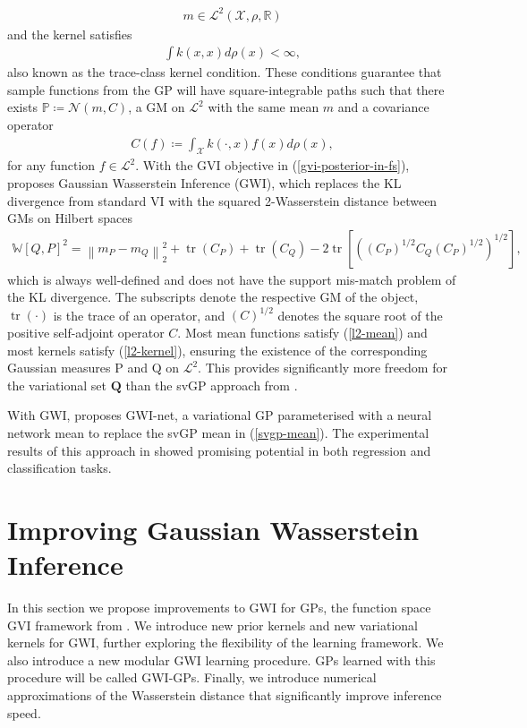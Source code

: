 \documentclass{article}
\newcommand{\tr}{\operatorname{tr}}
\numberwithin{equation}{section}
\begin{document}
\begin{align}
    m \in \mathcal{L}^2\left(\mathcal{X}, \rho, \mathbb{R}\right)
    \label{l2-mean}
\end{align}
and the kernel satisfies
\begin{align}
    \int k(x, x) d\rho(x) < \infty,
    \label{l2-kernel}
\end{align}
also known as the trace-class kernel condition.
These conditions guarantee that sample functions from the GP will have square-integrable paths such that there exists $\mathbb{P} \coloneqq \mathcal{N}(m, C)$, a GM on $\mathcal{L}^2$ with the same mean $m$ and a covariance operator
\begin{align}
    C(f) \coloneqq \int_{\mathcal{X}} k(\cdot, x) f(x) d\rho(x),
\end{align}
for any function $f \in \mathcal{L}^2$.
With the GVI objective in (\ref{gvi-posterior-in-fs}), \cite{wild2022generalized} proposes Gaussian Wasserstein Inference (GWI), which replaces the KL divergence from standard VI with the squared 2-Wasserstein distance between GMs on Hilbert spaces 
\begin{align}
    \mathbb{W}\left[Q, P\right]^2 = \left\|m_P - m_Q\right\|_2^2 + \tr\left(C_P\right) + \tr\left(C_Q\right) - 2 \tr \left[\left(\left(C_P\right)^{1/2} C_Q \left(C_P\right)^{1/2} \right)^{1/2}\right],
    \label{wasserstein-distance}
\end{align}
which is always well-defined and does not have the support mis-match problem of the KL divergence.
The subscripts denote the respective GM of the object, $\tr(\cdot)$ is the trace of an operator, and $(C)^{1/2}$ denotes the square root of the positive self-adjoint operator $C$.
Most mean functions satisfy (\ref{l2-mean}) and most kernels satisfy (\ref{l2-kernel}), ensuring the existence of the corresponding Gaussian measures P and Q on $\mathcal{L}^2$.
This provides significantly more freedom for the variational set $\boldsymbol{Q}$ than the svGP approach from \cite{titsias2009variational}.

With GWI, \cite{wild2022generalized} proposes GWI-net, a variational GP parameterised with a neural network mean to replace the svGP mean in (\ref{svgp-mean}).
The experimental results of this approach in \cite{wild2022generalized} showed promising potential in both regression and classification tasks.

\newpage

\section{Improving Gaussian Wasserstein Inference}\label{section:improving-gwi}
In this section we propose improvements to GWI for GPs, the function space GVI framework from \cite{wild2022generalized}.
We introduce new prior kernels and new variational kernels for GWI, further exploring the flexibility of the learning framework.
We also introduce a new modular GWI learning procedure.
GPs learned with this procedure will be called GWI-GPs.
Finally, we introduce numerical approximations of the Wasserstein distance that significantly improve inference speed.
\end{document}
